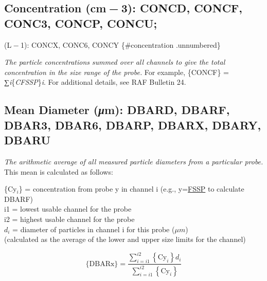 \documentclass[
]{book}
\begin{document}
\hypertarget{concentration-cm-3-concd-concf-conc3-concp-concu}{%
\subsection{\texorpdfstring{Concentration (cm{ − 3}): CONCD, CONCF, CONC3, CONCP, CONCU;}{Concentration (cm − 3): CONCD, CONCF, CONC3, CONCP, CONCU;}}\label{concentration-cm-3-concd-concf-conc3-concp-concu}}

(L{ − 1}): CONCX, CONC6, CONCY \{\#concentration .unnumbered\}

\emph{The particle concentrations} \emph{summed over all channels to give the total concentration in the size range of the probe.} For example, \{CONCF\} = {∑\emph{i}\{\emph{CFSSP}\}\emph{i}}. For additional details, see RAF Bulletin 24.

\hypertarget{mean-diameter}{%
\subsection*{\texorpdfstring{Mean Diameter ({\emph{μ}}m): DBARD, DBARF, DBAR3, DBAR6, DBARP, DBARX, DBARY, DBARU}{Mean Diameter (μm): DBARD, DBARF, DBAR3, DBAR6, DBARP, DBARX, DBARY, DBARU}}\label{mean-diameter}}

\emph{The arithmetic average of all measured particle diameters from a particular probe.} This mean is calculated as follows:

\{Cy\(_{i}\)\} = concentration
from probe y in channel i
\hspace{0.6cm}(e.g., y=\protect\hyperlink{size-distribution}{FSSP} to calculate DBARF)\\
i1 = lowest usable channel for the probe\\
i2 = highest usable channel for the probe\\
\(d_{i}\)
= diameter of particles in channel i for this probe (\(\mu m\))\\
\hspace*{0.6cm}(calculated as the average of the lower and upper
size limits for the channel)

\begin{equation}
\mathrm{\{DBARx\}}=\frac{{\textstyle \sum_{i=i1}^{i2}}{\displaystyle {\displaystyle \left\{ \mathrm{Cy}_{i}\right\} d_{i}}}}{\sum_{i=i1}^{i2}\left\{ \mathrm{Cy}_{i}\right\} }
\label{eq:DBARbox}
\end{equation}
\end{document}
